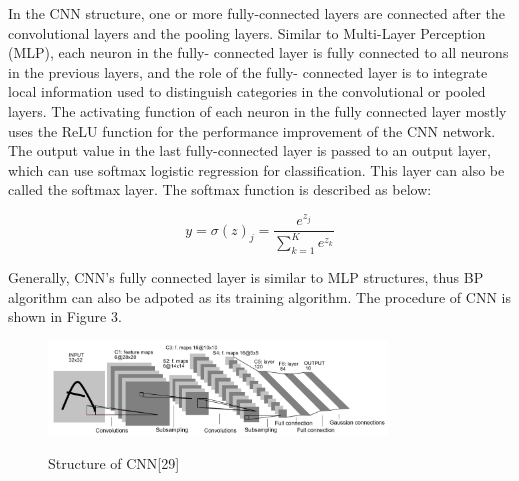\documentclass[journal]{IEEEtran}
\begin{document}
In the CNN structure, one or more fully-connected layers are connected after the convolutional layers and the pooling layers. Similar to Multi-Layer Perception (MLP), each neuron in the fully- connected layer is fully connected to all neurons in the previous layers, and the role of the fully- connected layer is to integrate local information used to distinguish categories in the convolutional or pooled layers. The activating function of each neuron in the fully connected layer mostly uses the ReLU function for the performance improvement of the CNN network. The output value in the last fully-connected layer is passed to an output layer, which can use softmax logistic regression for classification. This layer can also be called the softmax layer. The softmax function is described as below:

\begin{equation}
y=\sigma(z)_j = \frac{e^{z_j}}{\sum_{k=1}^{K}e^{z_k}}
\end{equation}

Generally, CNN's fully connected layer is similar to MLP structures, thus BP algorithm can also be adpoted as its training algorithm. The procedure of CNN is shown in Figure 3.
\begin{figure}[H]
	\centering
	\includegraphics[width=9cm]{cnn.pdf}\\
	\caption{Structure of CNN[29]}
	\label{Doc5}
\end{figure}
\end{document}
